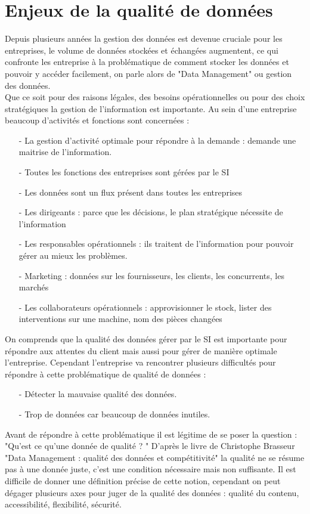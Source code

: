 \section {Enjeux de la qualité de données}
Depuis plusieurs années la gestion des données est devenue cruciale pour les entreprises, le volume de données stockées et échangées augmentent, ce qui confronte les entreprise à la problématique de comment stocker les données et pouvoir y accéder facilement, on parle alors de  "Data Management" ou gestion des données.\\ Que ce soit pour des raisons légales, des besoins opérationnelles ou pour des choix stratégiques la gestion de l'information est importante.  Au sein d'une entreprise beaucoup d'activités et fonctions sont concernées :
\begin{itemize}
\item[-] La gestion d’activité optimale pour répondre à la demande : demande une maitrise de l’information.
\item[-] Toutes les fonctions des entreprises sont gérées par le SI
\item[-] Les données sont un flux présent dans toutes les entreprises
\item[-] Les dirigeants : parce que les décisions, le plan stratégique nécessite de l’information
\item[-] Les responsables opérationnels : ils traitent de l’information pour pouvoir gérer au mieux les problèmes. 
\item[-] Marketing : données sur les fournisseurs, les clients, les concurrents, les marchés
\item[-] Les collaborateurs opérationnels : approvisionner le stock, lister des interventions sur une machine, nom des pièces changées
\end{itemize}
On comprends que la qualité des données gérer par le SI est importante pour répondre aux attentes du client mais aussi pour gérer de manière optimale l'entreprise. Cependant l'entreprise va rencontrer plusieurs difficultés pour répondre à cette problématique de  qualité de données : 
\begin{itemize}
\item[-]Détecter la mauvaise qualité des données.
\item[-]Trop de données car beaucoup de données inutiles. 
\end{itemize}
Avant de répondre à cette problématique il est légitime de se poser la question : "Qu'est ce qu'une donnée de qualité ? "
D'après le livre de Christophe Brasseur "Data Management : qualité des données et compétitivité" la qualité ne se résume pas à une donnée juste, c'est une condition nécessaire mais non suffisante. Il est difficile de donner une définition précise de cette notion, cependant on peut dégager plusieurs axes pour juger de la qualité des données : qualité du contenu, accessibilité, flexibilité, sécurité.
